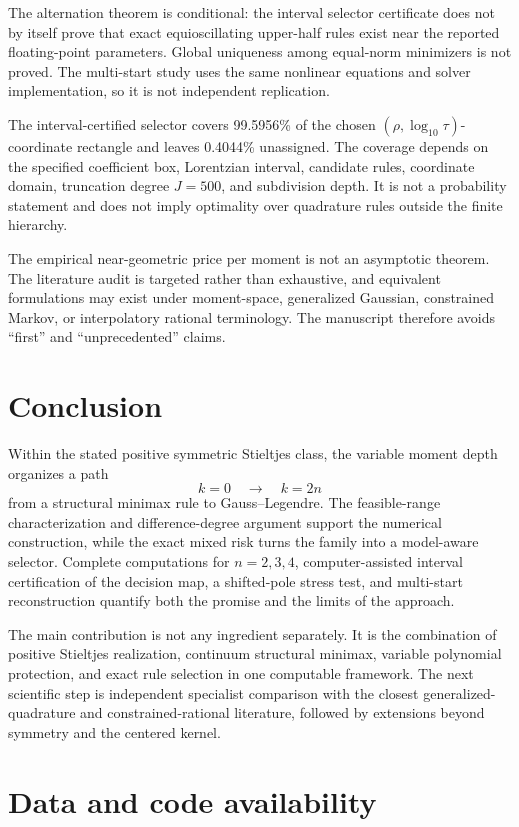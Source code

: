 \documentclass[preprint,12pt]{elsarticle}
\theoremstyle{remark}
\begin{document}
The alternation theorem is conditional: the interval selector
certificate does not by itself prove that exact equioscillating
upper-half rules exist near the reported floating-point parameters.
Global uniqueness among equal-norm minimizers is not proved. The
multi-start study uses the same nonlinear equations and solver
implementation, so it is not independent replication.

The interval-certified selector covers 99.5956\% of the
chosen \((\rho,\log_{10}\tau)\)-coordinate rectangle and leaves
0.4044\% unassigned. The coverage depends on the
specified coefficient box, Lorentzian interval, candidate rules,
coordinate domain, truncation degree \(J=500\), and subdivision depth.
It is not a probability statement and does not imply optimality over
quadrature rules outside the finite hierarchy.

The empirical near-geometric price per moment is not an asymptotic
theorem. The literature audit is targeted rather than exhaustive, and
equivalent formulations may exist under moment-space, generalized
Gaussian, constrained Markov, or interpolatory rational terminology.
The manuscript therefore avoids ``first'' and ``unprecedented'' claims.

\section{Conclusion}

Within the stated positive symmetric Stieltjes class, the variable
moment depth organizes a path
\[
k=0
\quad\longrightarrow\quad
k=2n
\]
from a structural minimax rule to Gauss--Legendre. The
feasible-range characterization and difference-degree argument support
the numerical construction, while the exact mixed risk turns the family
into a model-aware selector. Complete computations for \(n=2,3,4\),
computer-assisted interval certification of the decision map, a shifted-pole stress test, and
multi-start reconstruction quantify both the promise and the limits of
the approach.

The main contribution is not any ingredient separately. It is the
combination of positive Stieltjes realization, continuum structural
minimax, variable polynomial protection, and exact rule selection in one
computable framework. The next scientific step is independent
specialist comparison with the closest generalized-quadrature and
constrained-rational literature, followed by extensions beyond symmetry
and the centered kernel.

\section*{Data and code availability}
\end{document}
